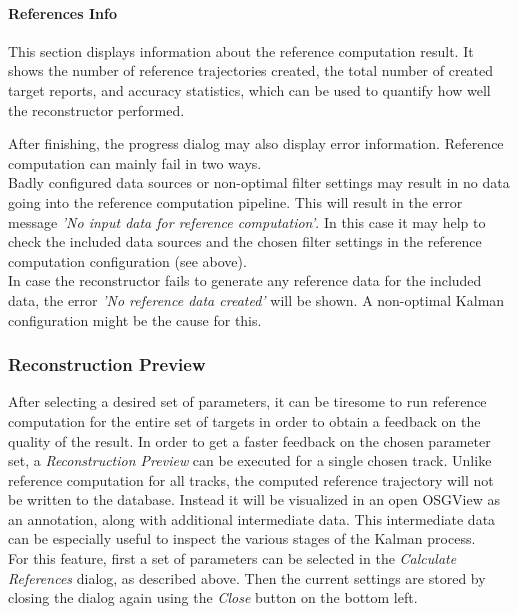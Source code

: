 \paragraph{References Info} This section displays information about the reference computation result.
It shows the number of reference trajectories created, the total number of created target reports, and 
accuracy statistics, which can be used to quantify how well the reconstructor performed.

After finishing, the progress dialog may also display error information. Reference computation can mainly fail in two ways. \\

Badly configured data sources or non-optimal filter settings may result in no data going into the reference computation pipeline.
This will result in the error message \textit{'No input data for reference computation'}. In this case it may help to 
check the included data sources and the chosen filter settings in the reference computation configuration (see above). \\

In case the reconstructor fails to generate any reference data for the included data, the error 
\textit{'No reference data created'} will be shown. A non-optimal Kalman configuration might be the cause for this.

\subsubsection{Reconstruction Preview}

After selecting a desired set of parameters, it can be tiresome to run reference computation for the entire 
set of targets in order to obtain a feedback on the quality of the result. In order to get a faster feedback on the 
chosen parameter set, a \textit{Reconstruction Preview} can be executed for a single chosen track. 
Unlike reference computation for all tracks, the computed reference trajectory will not be written to the database.
Instead it will be visualized in an open OSGView as an annotation, along with additional intermediate data.
This intermediate data can be especially useful to inspect the various stages of the Kalman process. \\

For this feature, first a set of parameters can be selected in the \textit{Calculate References} dialog, as described above.
Then the current settings are stored by closing the dialog again using the \textit{Close} button on the bottom left. \\

